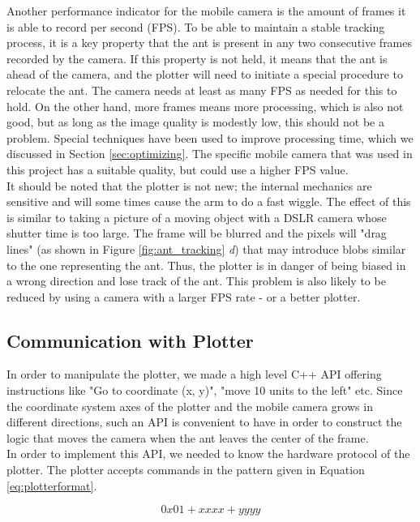 Another performance indicator for the mobile camera is the amount of frames it is able to record per second (FPS). To be able to maintain a stable tracking process, it is a key property that the ant is present in any two consecutive frames recorded by the camera. If this property is not held, it means that the ant is ahead of the camera, and the plotter will need to initiate a special procedure to relocate the ant. The camera needs at least as many FPS as needed for this to hold. On the other hand, more frames means more processing, which is also not good, but as long as the image quality is modestly low, this should not be a problem. Special techniques have been used to improve processing time, which we discussed in Section \ref{sec:optimizing}. The specific mobile camera that was used in this project has a suitable quality, but could use a higher FPS value. \\

It should be noted that the plotter is not new; the internal mechanics are sensitive and will some times cause the arm to do a fast wiggle. The effect of this is similar to taking a picture of a moving object with a DSLR camera whose shutter time is too large. The frame will be blurred and the pixels will "drag lines" (as shown in Figure \ref{fig:ant_tracking} \emph{d}) that may introduce blobs similar to the one representing the ant. Thus, the plotter is in danger of being biased in a wrong direction and lose track of the ant. This problem is also likely to be reduced by using a camera with a larger FPS rate - or a better plotter. \\

\subsection{Communication with Plotter}
In order to manipulate the plotter, we made a high level C++ API offering instructions like "Go to coordinate (x, y)", "move 10 units to the left" etc. Since the coordinate system axes of the plotter and the mobile camera grows in different directions, such an API is convenient to have in order to construct the logic that moves the camera when the ant leaves the center of the frame. \\

\newpage
In order to implement this API, we needed to know the hardware protocol of the plotter. The plotter accepts commands in the pattern given in Equation \ref{eq:plotterformat}.

\begin{center}
  \begin{equation}
  \label{eq:plotterformat}
    0x01 +  xxxx +  yyyy
  \end{equation}
\end{center}

